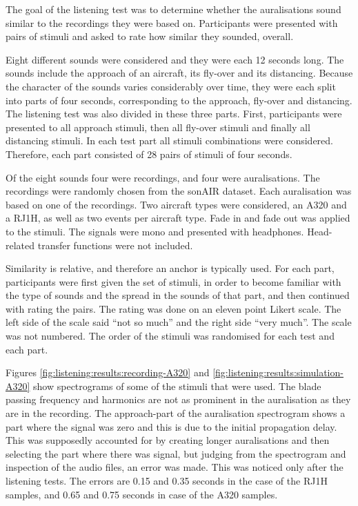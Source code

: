 \documentclass[10pt,twocolumn]{article}
\begin{document}
The goal of the listening test was to determine whether the auralisations sound
similar to the recordings they were based on. Participants were presented with
pairs of stimuli and asked to rate how similar they sounded, overall.

Eight different sounds were considered and they were each 12 seconds long. The
sounds include the approach of an aircraft, its fly-over and its distancing.
Because the character of the sounds varies considerably over time, they were
each split into parts of four seconds, corresponding to the approach, fly-over
and distancing. The listening test was also divided in these three parts. First,
participants were presented to all approach stimuli, then all fly-over stimuli
and finally all distancing stimuli. In each test part all stimuli combinations
were considered. Therefore, each part consisted of 28 pairs of stimuli of four
seconds.

Of the eight sounds four were recordings, and four were auralisations.
The recordings were randomly chosen from the sonAIR dataset. Each
auralisation was based on one of the recordings. Two aircraft types were
considered, an A320 and a RJ1H, as well as two events per aircraft type.
Fade in and fade out was applied to the stimuli. The signals were mono and
presented with headphones. Head-related transfer functions were not included.

Similarity is relative, and therefore an anchor is typically used. For each
part, participants were first given the set of stimuli, in order to become
familiar with the type of sounds and the spread in the sounds of that part, and
then continued with rating the pairs. The rating was done on an eleven point
Likert scale. The left side of the scale said ``not so much'' and the right side
``very much''. The scale was not numbered. The order of the stimuli was
randomised for each test and each part.

Figures \ref{fig:listening:results:recording-A320} and
\ref{fig:listening:results:simulation-A320} show spectrograms of some of the
stimuli that were used. The blade passing frequency and harmonics are not as
prominent in the auralisation as they are in the recording. The approach-part of
the auralisation spectrogram shows a part where the signal was zero and this is
due to the initial propagation delay. This was supposedly accounted for by
creating longer auralisations and then selecting the part where there was
signal, but judging from the spectrogram and inspection of the audio files, an
error was made. This was noticed only after the listening tests. The errors are
0.15 and 0.35 seconds in the case of the RJ1H samples, and 0.65 and 0.75 seconds
in case of the A320 samples.
\end{document}
